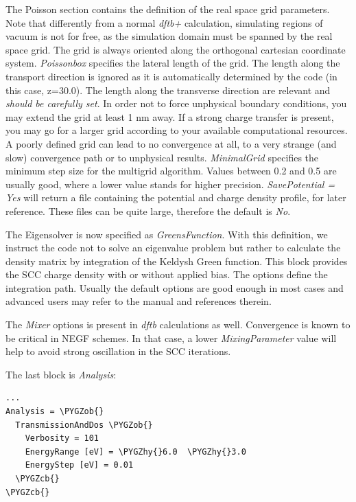 \documentclass[a4paper,11pt,english]{sphinxmanual}
\def\PYGZob{\char`\{}
\def\PYGZcb{\char`\}}
\def\PYGZhy{\char`\-}
\begin{document}
{{The Poisson section contains the definition of the real space grid
parameters. Note that differently from a normal \emph{dftb+} calculation,
simulating regions of vacuum is not for free, as the simulation domain
must be spanned by the real space grid. The grid is always oriented
along the orthogonal cartesian coordinate system. \emph{Poissonbox}
specifies the lateral length of the grid. The length along the
transport direction is ignored as it is automatically determined by
the code (in this case, z=30.0). The length along the transverse
direction are relevant and \emph{should be carefully set}. In order not to
force unphysical boundary conditions, you may extend the grid at least
1 nm away. If a strong charge transfer is present, you may go for a
larger grid according to your available computational resources. A
poorly defined grid can lead to no convergence at all, to a very
strange (and slow) convergence path or to unphysical
results. \emph{MinimalGrid} specifies the minimum step size for the
multigrid algorithm. Values between 0.2 and 0.5 are usually good,
where a lower value stands for higher precision. \emph{SavePotential = Yes}
will return a file containing the potential and charge density
profile, for later reference. These files can be quite large,
therefore the default is \emph{No}.

The Eigensolver is now specified as \emph{GreensFunction}. With this
definition, we instruct the code not to solve an eigenvalue problem
but rather to calculate the density matrix by integration of the
Keldysh Green function. This block provides the SCC charge density
with or without applied bias. The options define the integration
path. Usually the default options are good enough in most cases and
advanced users may refer to the manual and references therein.

The \emph{Mixer} options is present in \emph{dftb} calculations as
well. Convergence is known to be critical in NEGF schemes. In that
case, a lower \emph{MixingParameter} value will help to avoid strong
oscillation in the SCC iterations.

The last block is \emph{Analysis}:

\begin{Verbatim}[commandchars=\\\{\}]
...
Analysis = \PYGZob{}
  TransmissionAndDos \PYGZob{}
    Verbosity = 101
    EnergyRange [eV] = \PYGZhy{}6.0  \PYGZhy{}3.0
    EnergyStep [eV] = 0.01
  \PYGZcb{}
\PYGZcb{}
\end{Verbatim}

}}
\end{document}
